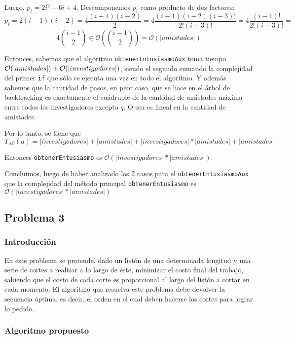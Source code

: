 \documentclass[12pt, a4paper,english,spanish]{article}
\begin{document}
\begin{itemize}
Luego, $p_i = 2i^2-6i+4$. Descomponemos $p_i$ como producto de dos factores: $$p_i = 2(i-1)(i-2) = 4 \frac{(i-1)(i-2)}{2} = 4 \frac{(i-1)(i-2)(i-3)!}{2!(i-3)!} = 4 \frac{(i-1)!}{2! (i-3)!} =$$ $$4 \binom{i-1}{2} \in \mathcal{O}\left(\binom{i-1}{2}\right) = \mathcal{O}\left(|amistades|\right) $$

Entonces, sabemos que el algoritmo \texttt{obtenerEntusiasmoAux} toma tiempo $\\ \mathcal{O}(|amistades|) + \mathcal{O}(|investigadores|)$, siendo el segundo sumando la complejidad del primer \texttt{if} que s\'olo se ejecuta una vez en todo el algoritmo. Y adem\'as sabemos que la cantidad de pasos, en peor caso, que se hace en el \'arbol de backtracking es exactamente el cu\'adruple de la cantidad de amistades m\'axima entre todos los investigadores excepto $q$. O sea es lineal en la cantidad de amistades.

Por lo tanto, se tiene que $T_{oE}(a) = |investigadores| + |amistades| + |investigadores| * |amistades| + |amistades|$

Entonces \texttt{obtenerEntusiasmo} es $\mathcal{O}(|investigadores| * |amistades|)$.   \\

\end{itemize}

Concluimos, luego de haber analizado los 2 casos para el \texttt{obtenerEntusiasmoAux} que la complejidad del m\'etodo principal \texttt{obtenerEntusiasmo} es $\mathcal{O}(|investigadores| * |amistades|)$


\newpage


\subsection*{Problema 3}
\subsubsection*{Introducci\'on}
En este problema se pretende, dado un list\'on de una determinada longitud y una serie de cortes a realizar a lo largo de \'este, minimizar el costo final del trabajo, sabiendo que el costo de cada corte es proporcional al largo del list\'on a cortar en cada momento. El algoritmo que resuelva este problema debe devolver la secuencia \'optima, es decir, el orden en el cual deben hacerse los cortes para lograr lo pedido. 

\subsubsection*{Algoritmo propuesto}
\end{document}
